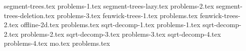 {segment-trees.tex}
{problems-1.tex}
{segment-trees-lazy.tex}
{problems-2.tex}
{segment-trees-deletion.tex}
{problems-3.tex}
{fenwick-trees-1.tex}
{problems.tex}
{fenwick-trees-2.tex}
{offline-2d.tex}
{problems.tex}
{sqrt-decomp-1.tex}
{problems-1.tex}
{sqrt-decomp-2.tex}
{problems-2.tex}
{sqrt-decomp-3.tex}
{problems-3.tex}
{sqrt-decomp-4.tex}
{problems-4.tex}
{mo.tex}
{problems.tex}
